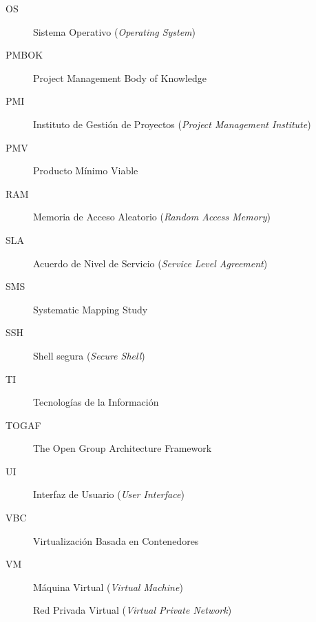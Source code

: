\begin{description}
  \item[OS] Sistema Operativo (\textit{Operating System})
  \item[PMBOK] Project Management Body of Knowledge
  \item[PMI] Instituto de Gestión de Proyectos (\textit{Project Management Institute})
  \item[PMV] Producto Mínimo Viable
  \item[RAM] Memoria de Acceso Aleatorio (\textit{Random Access Memory})
  \item[SLA] Acuerdo de Nivel de Servicio (\textit{Service Level Agreement})
  \item[SMS] Systematic Mapping Study
  \item[SSH] Shell segura (\textit{Secure Shell})
  \item[TI] Tecnologías de la Información
  \item[TOGAF] The Open Group Architecture Framework
  \item[UI] Interfaz de Usuario (\textit{User Interface})
  \item[VBC] Virtualización Basada en Contenedores
  \item[VM] Máquina Virtual (\textit{Virtual Machine})
  \item[\VPN] Red Privada Virtual (\textit{Virtual Private Network})
\end{description}